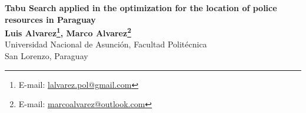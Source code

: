 \documentclass{article}
\begin{document}
\begin{center}

{\LARGE \textbf{Tabu Search applied in the optimization for the location of police resources in Paraguay}}\\
\bigskip
{\large \textbf{Luis Alvarez\footnote{E-mail: \href{mailto:lalvarez.pol@gmail.com}{lalvarez.pol@gmail.com}}, Marco Alvarez\footnote{E-mail: \href{mailto:marcoalvarez@outlook.com}{marcoalvarez@outlook.com}}}\\Universidad Nacional de Asunción, Facultad Politécnica\\San Lorenzo, Paraguay}
\end{center}















\end{document}
